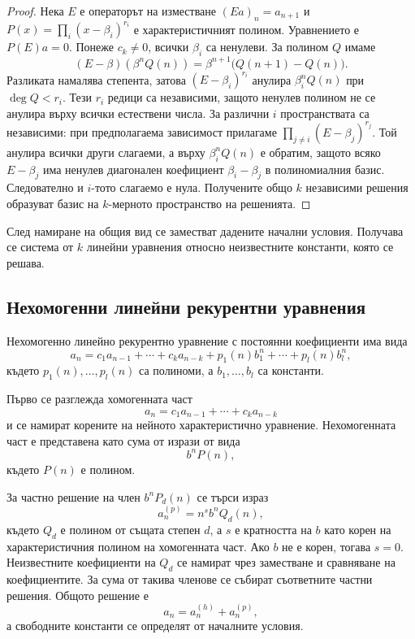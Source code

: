 \begin{proof}
Нека $E$ е операторът на изместване $(Ea)_n=a_{n+1}$ и $P(x)=\prod_i(x-\beta_i)^{r_i}$ е характеристичният полином. Уравнението е $P(E)a=0$. Понеже $c_k\ne0$, всички $\beta_i$ са ненулеви. За полином $Q$ имаме
\[(E-\beta)(\beta^nQ(n))=\beta^{n+1}\bigl(Q(n+1)-Q(n)\bigr).\]
Разликата намалява степента, затова $(E-\beta_i)^{r_i}$ анулира $\beta_i^nQ(n)$ при $\deg Q<r_i$. Тези $r_i$ редици са независими, защото ненулев полином не се анулира върху всички естествени числа. За различни $i$ пространствата са независими: при предполагаема зависимост прилагаме $\prod_{j\ne i}(E-\beta_j)^{r_j}$. Той анулира всички други слагаеми, а върху $\beta_i^nQ(n)$ е обратим, защото всяко $E-\beta_j$ има ненулев диагонален коефициент $\beta_i-\beta_j$ в полиномиалния базис. Следователно и $i$-тото слагаемо е нула. Получените общо $k$ независими решения образуват базис на $k$-мерното пространство на решенията.
\end{proof}

След намиране на общия вид се заместват дадените начални условия. Получава се система от $k$ линейни уравнения относно неизвестните константи, която се решава.

\subsection{Нехомогенни линейни рекурентни уравнения}\label{s:2.4.2}

Нехомогенно линейно рекурентно уравнение с постоянни коефициенти има вида
\[
a_n=c_1a_{n-1}+\cdots+c_ka_{n-k}
+p_1(n)b_1^n+\cdots+p_l(n)b_l^n,
\]
където $p_1(n),\ldots,p_l(n)$ са полиноми, а $b_1,\ldots,b_l$ са константи.

Първо се разглежда хомогенната част
\[
a_n=c_1a_{n-1}+\cdots+c_ka_{n-k}
\]
и се намират корените на нейното характеристично уравнение. Нехомогенната част е представена като сума от изрази от вида
\[
b^nP(n),
\]
където $P(n)$ е полином.

За частно решение на член $b^nP_d(n)$ се търси израз
\[
a_n^{(p)}=n^s b^nQ_d(n),
\]
където $Q_d$ е полином от същата степен $d$, а $s$ е кратността на $b$ като корен на характеристичния полином на хомогенната част. Ако $b$ не е корен, тогава $s=0$. Неизвестните коефициенти на $Q_d$ се намират чрез заместване и сравняване на коефициентите. За сума от такива членове се събират съответните частни решения. Общото решение е
\[
a_n=a_n^{(h)}+a_n^{(p)},
\]
а свободните константи се определят от началните условия.

